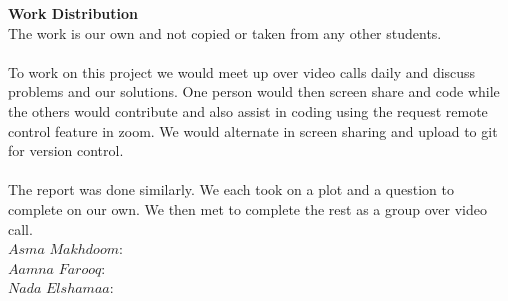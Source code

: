 \documentclass{article}
\theoremstyle{definition}
\begin{document}
\smallskip

\textbf{Work Distribution}
\\
The work is our own and not copied or taken from any other students. 
\\\\
To work on this project we would meet up over video calls daily and discuss problems and our solutions. One person would then screen share and code while the others would contribute and also assist in coding using the request remote control feature in zoom. We would alternate in screen sharing and upload to git for version control. 
\\\\
The report was done similarly. We each took on a plot and a question to complete on our own. We then met to complete the rest as a group over video call. 
\\
$Asma$ $Makhdoom:$ 
\\
$Aamna$ $Farooq:$ 
\\
$Nada$ $Elshamaa:$ 
\\
\smallskip
\end{document}
